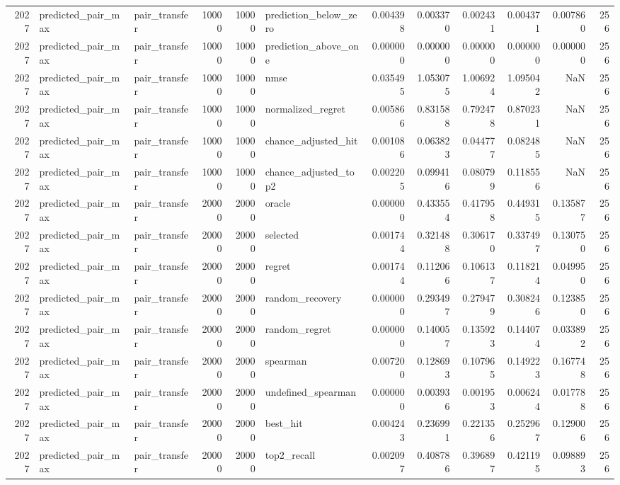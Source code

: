 \begin{tabular}{rllrrlrrrrrr}
2027 & predicted_pair_max & pair_transfer & 10000 & 10000 & prediction_below_zero & 0.004398 & 0.003370 & 0.002431 & 0.004371 & 0.007860 & 256 \\
2027 & predicted_pair_max & pair_transfer & 10000 & 10000 & prediction_above_one & 0.000000 & 0.000000 & 0.000000 & 0.000000 & 0.000000 & 256 \\
2027 & predicted_pair_max & pair_transfer & 10000 & 10000 & nmse & 0.035495 & 1.053075 & 1.006924 & 1.095042 & NaN & 256 \\
2027 & predicted_pair_max & pair_transfer & 10000 & 10000 & normalized_regret & 0.005866 & 0.831588 & 0.792478 & 0.870231 & NaN & 256 \\
2027 & predicted_pair_max & pair_transfer & 10000 & 10000 & chance_adjusted_hit & 0.001086 & 0.063823 & 0.044777 & 0.082485 & NaN & 256 \\
2027 & predicted_pair_max & pair_transfer & 10000 & 10000 & chance_adjusted_top2 & 0.002205 & 0.099416 & 0.080799 & 0.118556 & NaN & 256 \\
2027 & predicted_pair_max & pair_transfer & 20000 & 20000 & oracle & 0.000000 & 0.433554 & 0.417958 & 0.449315 & 0.135877 & 256 \\
2027 & predicted_pair_max & pair_transfer & 20000 & 20000 & selected & 0.001744 & 0.321488 & 0.306170 & 0.337497 & 0.130750 & 256 \\
2027 & predicted_pair_max & pair_transfer & 20000 & 20000 & regret & 0.001744 & 0.112066 & 0.106137 & 0.118214 & 0.049950 & 256 \\
2027 & predicted_pair_max & pair_transfer & 20000 & 20000 & random_recovery & 0.000000 & 0.293497 & 0.279479 & 0.308246 & 0.123850 & 256 \\
2027 & predicted_pair_max & pair_transfer & 20000 & 20000 & random_regret & 0.000000 & 0.140057 & 0.135923 & 0.144074 & 0.033892 & 256 \\
2027 & predicted_pair_max & pair_transfer & 20000 & 20000 & spearman & 0.007200 & 0.128693 & 0.107965 & 0.149223 & 0.167748 & 256 \\
2027 & predicted_pair_max & pair_transfer & 20000 & 20000 & undefined_spearman & 0.000000 & 0.003936 & 0.001953 & 0.006244 & 0.017788 & 256 \\
2027 & predicted_pair_max & pair_transfer & 20000 & 20000 & best_hit & 0.004243 & 0.236991 & 0.221356 & 0.252967 & 0.129006 & 256 \\
2027 & predicted_pair_max & pair_transfer & 20000 & 20000 & top2_recall & 0.002097 & 0.408786 & 0.396897 & 0.421195 & 0.098893 & 256 \\

\end{tabular}

